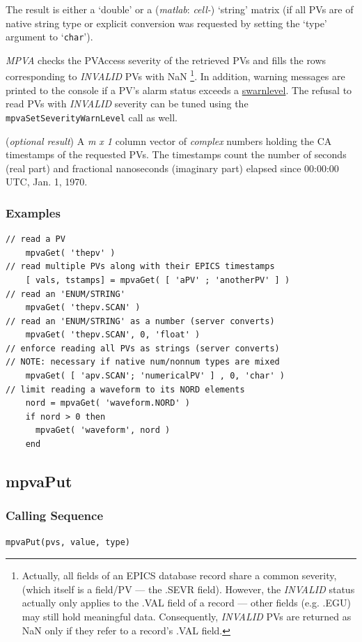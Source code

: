 \documentclass{article}
\newcommand{\sca}{\ita{MPVA}}
\newcommand{\matlab}{\ita{matlab}}
\newcommand{\com}[1]{{\tt #1}}
\newcommand{\NAN}{\mbox{NaN}}
\newcommand{\pbrk}{\pagebreak[3]}
\newcommand{\ita}[1]{\emph{#1}}
\newcommand{\mxl}{$m\times 1$}
\renewcommand{\mxl}{\ita{m x 1}}
\renewcommand{\pbrk}{}
\begin{document}
\begin{description}
The result is either a `double' or a (\matlab: \ita{cell-}) `string'
matrix (if all PVs are of native string type or explicit conversion
was requested by setting the `type' argument to `\com{char}').

\sca{} checks the PVAccess severity of the retrieved PVs and
fills the rows corresponding to \ita{INVALID} PVs with \NAN%
\footnote{
Actually, all fields of an EPICS database record share a common
severity, (which itself is a field/PV --- the .SEVR field). However,
the \ita{INVALID} status actually only applies to the .VAL field
of a record --- other fields (e.g. .EGU) may still hold meaningful data.
Consequently, \ita{INVALID} PVs are returned as \NAN{} only if
they refer to a record's .VAL field.
}. In addition, warning
messages are printed to the console if a PV's alarm status exceeds
a \hyperref{configurable threshold}{configurable threshold (see }{ )}{swarnlevel}.
The refusal to read PVs with \ita{INVALID} severity can be tuned using
the \com{mpvaSetSeverityWarnLevel} call as well.
%
%
\item[timestamp] (\ita{optional result}) A \mxl{}
column vector of \ita{complex} numbers holding the CA timestamps of
the requested PVs. The timestamps count the number of seconds (real part)
and fractional nanoseconds (imaginary part) elapsed since
00:00:00 UTC, Jan. 1, 1970.
\end{description}
\subsubsection{Examples}
\begin{verbatim}
// read a PV
    mpvaGet( 'thepv' )
// read multiple PVs along with their EPICS timestamps
    [ vals, tstamps] = mpvaGet( [ 'aPV' ; 'anotherPV' ] )
// read an 'ENUM/STRING'
    mpvaGet( 'thepv.SCAN' )
// read an 'ENUM/STRING' as a number (server converts)
    mpvaGet( 'thepv.SCAN', 0, 'float' )
// enforce reading all PVs as strings (server converts)
// NOTE: necessary if native num/nonnum types are mixed
    mpvaGet( [ 'apv.SCAN'; 'numericalPV' ] , 0, 'char' )
// limit reading a waveform to its NORD elements
    nord = mpvaGet( 'waveform.NORD' )
	if nord > 0 then
      mpvaGet( 'waveform', nord )
	end
\end{verbatim}

\pbrk
\subsection{mpvaPut}
\label{mpvaput}
\subsubsection{Calling Sequence}
\begin{verbatim}
mpvaPut(pvs, value, type)
\end{verbatim}
\end{document}
